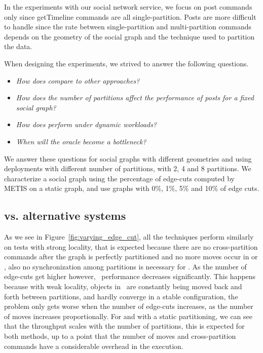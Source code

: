 In the experiments with our social network service, we focus on post
commands only since getTimeline commands are all single-partition.
Posts are more difficult to handle since the rate between
single-partition and multi-partition commands depends on the geometry
of the social graph and the technique used to partition the data.

When designing the experiments, we strived to answer the following questions.
\begin{itemize}
\item \emph{How does \dynastar compare to other approaches?} 
\item \emph{How does the number of partitions affect the performance of posts for a fixed social graph?}
\item \emph{How does \dynastar perform under dynamic workloads?}
\item \emph{When will the oracle become a bottleneck?}
\end{itemize}

We answer these questions for social graphs with different geometries
and using deployments with different number of partitions, with 2, 4
and 8 partitions.  We characterize a social graph using the percentage
of edge-cuts computed by METIS on a static graph, and use graphs with
0\%, 1\%, 5\% and 10\% of edge cuts.


\subsection{\dynastar vs. alternative systems}
\label{sec:evaluation:results}

As we see in Figure~\ref{fig:varying_edge_cut}, all the techniques
perform similarly on tests with strong locality, that is expected
because there are no cross-partition commands after the graph is
perfectly partitioned and no more moves occur in \dynastar or \dssmr,
also no synchronization among partitions is necessary for \ssmr.  As
the number of edge-cuts get higher however, \dssmr\ performance
decreases significantly.  This happens because with weak locality,
objects in \dssmr\ are constantly being moved back and forth between
partitions, and hardly converge in a stable configuration, the problem
only gets worse when the number of edge-cuts increases, as the number
of moves increases proportionally.  For \dynastar and \ssmr with a
static partitioning, we can see that the throughput scales with the
number of partitions, this is expected for both methods, up to a point
that the number of moves and cross-partition commands have a
considerable overhead in the execution.

